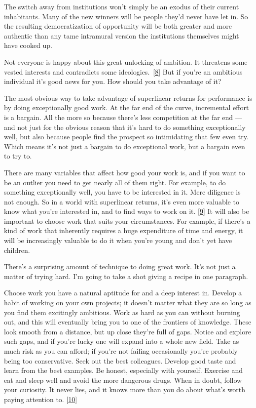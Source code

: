 The switch away from institutions won't simply be an exodus of their
current inhabitants. Many of the new winners will be people they'd never
have let in. So the resulting democratization of opportunity will be
both greater and more authentic than any tame intramural version the
institutions themselves might have cooked up.

Not everyone is happy about this great unlocking of ambition. It
threatens some vested interests and contradicts some
ideologies.~{[}\hyperref[f8n]{8}{]} But if you're an ambitious
individual it's good news for you. How should you take advantage of it?

The most obvious way to take advantage of superlinear returns for
performance is by doing exceptionally good work. At the far end of the
curve, incremental effort is a bargain. All the more so because there's
less competition at the far end --- and not just for the obvious reason
that it's hard to do something exceptionally well, but also because
people find the prospect so intimidating that few even try. Which means
it's not just a bargain to do exceptional work, but a bargain even to
try to.

There are many variables that affect how good your work is, and if you
want to be an outlier you need to get nearly all of them right. For
example, to do something exceptionally well, you have to be interested
in it. Mere diligence is not enough. So in a world with superlinear
returns, it's even more valuable to know what you're interested in, and
to find ways to work on it. {[}\hyperref[f9n]{9}{]} It will also be
important to choose work that suits your circumstances. For example, if
there's a kind of work that inherently requires a huge expenditure of
time and energy, it will be increasingly valuable to do it when you're
young and don't yet have children.

There's a surprising amount of technique to doing great work. It's not
just a matter of trying hard. I'm going to take a shot giving a recipe
in one paragraph.

Choose work you have a natural aptitude for and a deep interest in.
Develop a habit of working on your own projects; it doesn't matter what
they are so long as you find them excitingly ambitious. Work as hard as
you can without burning out, and this will eventually bring you to one
of the frontiers of knowledge. These look smooth from a distance, but up
close they're full of gaps. Notice and explore such gaps, and if you're
lucky one will expand into a whole new field. Take as much risk as you
can afford; if you're not failing occasionally you're probably being too
conservative. Seek out the best colleagues. Develop good taste and learn
from the best examples. Be honest, especially with yourself. Exercise
and eat and sleep well and avoid the more dangerous drugs. When in
doubt, follow your curiosity. It never lies, and it knows more than you
do about what's worth paying attention to. {[}\hyperref[f10n]{10}{]}

